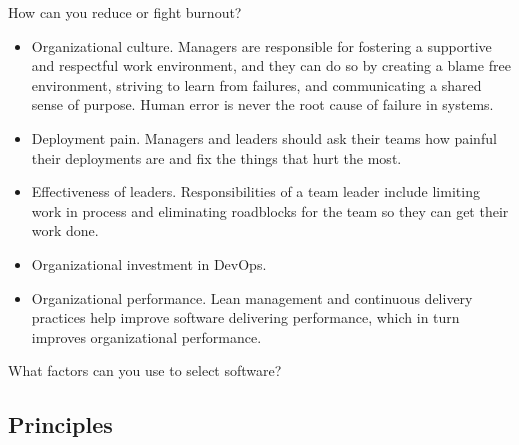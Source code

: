 \begin{questions}
\question[5] How can you reduce or fight burnout?
\begin{solution}
\begin{itemize}
    \item Organizational culture. Managers are responsible for fostering a supportive and respectful work environment, and they can do so by creating a blame free environment, striving to learn from failures, and communicating a shared sense of purpose. Human error is never the root cause of failure in systems.
    \item Deployment pain. Managers and leaders should ask their teams how painful their deployments are and fix the things that hurt the most.
    \item Effectiveness of leaders. Responsibilities of a team leader include limiting work in process and eliminating roadblocks for the team so they can get their work done.
    \item Organizational investment in DevOps.
    \item Organizational performance. Lean management and continuous delivery practices help improve software delivering performance, which in turn improves organizational performance.
\end{itemize}
\end{solution}

\question What factors can you use to select software?
\begin{solution}
\cite[p.~119]{fode}
\end{solution}
\end{questions}

\subsection{Principles}

